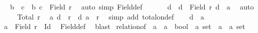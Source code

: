 \begin{isabellebody}
\ \isamarkupfalse%
\ {\isachardoublequoteopen}b\ {\isasymnoteq}\ c\ {\isasymand}\ {\isacharbraceleft}{\kern0pt}b{\isacharcomma}{\kern0pt}\ c{\isacharbraceright}{\kern0pt}\ {\isasymsubseteq}\ Field\ r{\isachardoublequoteclose}\ \isamarkupfalse%
\ {\isacharparenleft}{\kern0pt}auto\ simp{\isacharcolon}{\kern0pt}\ Field{\isacharunderscore}{\kern0pt}def{\isacharparenright}{\kern0pt}\isanewline
\ \ \isamarkupfalse%
\ {\isacharasterisk}{\kern0pt}\ \isamarkupfalse%
\ d\ \ {\isachardoublequoteopen}d\ {\isasymin}\ Field\ r{\isachardoublequoteclose}\ {\isachardoublequoteopen}d\ {\isasymnoteq}\ a{\isachardoublequoteclose}\ \isamarkupfalse%
\ auto\isanewline
\ \ \isamarkupfalse%
\ {\isacharasterisk}{\kern0pt}\ {\isacartoucheopen}Total\ r{\isacartoucheclose}\ \isamarkupfalse%
\ {\isachardoublequoteopen}{\isacharparenleft}{\kern0pt}a{\isacharcomma}{\kern0pt}\ d{\isacharparenright}{\kern0pt}\ {\isasymin}\ r\ {\isasymor}\ {\isacharparenleft}{\kern0pt}d{\isacharcomma}{\kern0pt}\ a{\isacharparenright}{\kern0pt}\ {\isasymin}\ r{\isachardoublequoteclose}\ \isamarkupfalse%
\ {\isacharparenleft}{\kern0pt}simp\ add{\isacharcolon}{\kern0pt}\ total{\isacharunderscore}{\kern0pt}on{\isacharunderscore}{\kern0pt}def{\isacharparenright}{\kern0pt}\isanewline
\ \ \isamarkupfalse%
\ {\isacartoucheopen}d\ {\isasymnoteq}\ a{\isacartoucheclose}\ \isamarkupfalse%
\ {\isachardoublequoteopen}a\ {\isasymin}\ Field\ {\isacharparenleft}{\kern0pt}r\ {\isacharminus}{\kern0pt}\ Id{\isacharparenright}{\kern0pt}{\isachardoublequoteclose}\ \isamarkupfalse%
\ Field{\isacharunderscore}{\kern0pt}def\ \isamarkupfalse%
\ blast\isanewline
{}\isamarkupfalse%
%
\endisatagproof
{\isafoldproof}%
%
\isadelimproof
%
\endisadelimproof
%
\isadelimdocument
%
\endisadelimdocument
%
\isatagdocument
%
\isamarkuptrue%
%
\endisatagdocument
{\isafolddocument}%
%
\isadelimdocument
%
\endisadelimdocument
{}\isamarkupfalse%
\ relation{\isacharunderscore}{\kern0pt}of\ {\isacharcolon}{\kern0pt}{\isacharcolon}{\kern0pt}\ {\isachardoublequoteopen}{\isacharparenleft}{\kern0pt}{\isacharprime}{\kern0pt}a\ {\isasymRightarrow}\ {\isacharprime}{\kern0pt}a\ {\isasymRightarrow}\ bool{\isacharparenright}{\kern0pt}\ {\isasymRightarrow}\ {\isacharprime}{\kern0pt}a\ set\ {\isasymRightarrow}\ {\isacharparenleft}{\kern0pt}{\isacharprime}{\kern0pt}a\ {\isasymtimes}\ {\isacharprime}{\kern0pt}a{\isacharparenright}{\kern0pt}\ set{\isachardoublequoteclose}\isanewline

\end{isabellebody}
